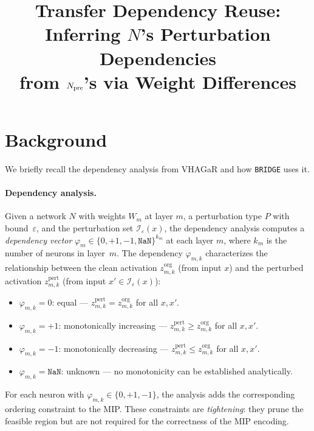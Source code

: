 \documentclass[11pt]{article}
\title{Transfer Dependency Reuse:\\Inferring $N$'s Perturbation Dependencies\\from $N_{\mathrm{pre}}$'s via Weight Differences}
\author{}
\date{}
\theoremstyle{definition}
\newcommand{\tool}{\texttt{BRIDGE}\xspace}
\newcommand{\xp}{x'}
\newcommand{\ep}{\varepsilon}
\newcommand{\mI}{\mathcal{I}}
\begin{document}
\maketitle

\section{Background}
\label{sec:background}

We briefly recall the dependency analysis from VHAGaR and how \tool uses it.

\paragraph{Dependency analysis.}
Given a network $N$ with weights $W_m$ at layer $m$, a perturbation type $P$ with bound~$\ep$, and the perturbation set $\mI_\ep(x)$, the dependency analysis computes a \emph{dependency vector} $\varphi_m \in \{0, +1, -1, \mathtt{NaN}\}^{k_m}$ at each layer $m$, where $k_m$ is the number of neurons in layer~$m$. The dependency $\varphi_{m,k}$ characterizes the relationship between the clean activation $z_{m,k}^{\mathrm{org}}$ (from input $x$) and the perturbed activation $z_{m,k}^{\mathrm{pert}}$ (from input $\xp \in \mI_\ep(x)$):
\begin{itemize}
  \item $\varphi_{m,k} = 0$: equal --- $z_{m,k}^{\mathrm{pert}} = z_{m,k}^{\mathrm{org}}$ for all $x, \xp$.
  \item $\varphi_{m,k} = +1$: monotonically increasing --- $z_{m,k}^{\mathrm{pert}} \ge z_{m,k}^{\mathrm{org}}$ for all $x, \xp$.
  \item $\varphi_{m,k} = -1$: monotonically decreasing --- $z_{m,k}^{\mathrm{pert}} \le z_{m,k}^{\mathrm{org}}$ for all $x, \xp$.
  \item $\varphi_{m,k} = \mathtt{NaN}$: unknown --- no monotonicity can be established analytically.
\end{itemize}
For each neuron with $\varphi_{m,k} \in \{0, +1, -1\}$, the analysis adds the corresponding ordering constraint to the MIP. These constraints are \emph{tightening}: they prune the feasible region but are not required for the correctness of the MIP encoding.
\end{document}
